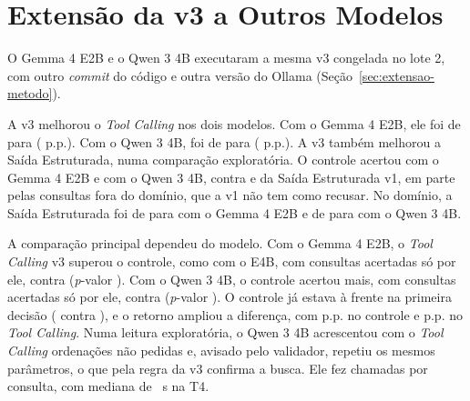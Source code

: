 \section{Extensão da v3 a Outros Modelos}
\label{sec:outros-modelos}

O Gemma 4 E2B e o Qwen 3 4B executaram a mesma v3 congelada no lote 2, com outro \textit{commit} do código e outra versão do Ollama (Seção~\ref{sec:extensao-metodo}).

A v3 melhorou o \textit{Tool Calling} nos dois modelos. Com o Gemma 4 E2B, ele foi de  para  ( p.p.). Com o Qwen 3 4B, foi de  para  ( p.p.). A v3 também melhorou a Saída Estruturada, numa comparação exploratória. O controle acertou  com o Gemma 4 E2B e  com o Qwen 3 4B, contra  e  da Saída Estruturada v1, em parte pelas consultas fora do domínio, que a v1 não tem como recusar. No domínio, a Saída Estruturada foi de  para  com o Gemma 4 E2B e de  para  com o Qwen 3 4B.

A comparação principal dependeu do modelo. Com o Gemma 4 E2B, o \textit{Tool Calling} v3 superou o controle, como com o E4B, com  consultas acertadas só por ele, contra  (\textit{p}-valor ). Com o Qwen 3 4B, o controle acertou mais, com  consultas acertadas só por ele, contra  (\textit{p}-valor ). O controle já estava à frente na primeira decisão ( contra ), e o retorno ampliou a diferença, com  p.p. no controle e  p.p. no \textit{Tool Calling}. Numa leitura exploratória, o Qwen 3 4B acrescentou com o \textit{Tool Calling} ordenações não pedidas e, avisado pelo validador, repetiu os mesmos parâmetros, o que pela regra da v3 confirma a busca. Ele fez  chamadas por consulta, com mediana de ~s na T4.

